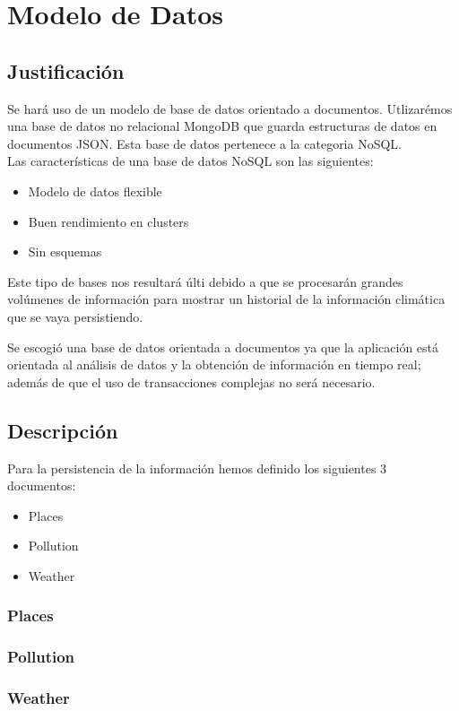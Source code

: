 \clearpage
\chapter{Modelo de Datos}

\section{Justificación}
Se hará uso de un modelo de base de datos orientado a documentos. Utlizarémos una base de datos no relacional MongoDB que guarda estructuras de datos en documentos JSON. Esta base de datos pertenece a la categoria NoSQL. \\
\newline
Las características de una base de datos NoSQL son las siguientes:

\begin{itemize}
  \item Modelo de datos flexible
  \item Buen rendimiento en clusters 
  \item Sin esquemas
\end{itemize}

Este tipo de bases nos resultará últi debido a que se procesarán grandes volúmenes de información para mostrar un historial de la información climática que se vaya persistiendo. 

Se escogió una base de datos orientada a documentos ya que la aplicación está orientada al análisis de datos y la obtención de información en tiempo real; además de que el uso de transacciones complejas no será necesario. 

\section{Descripción}
Para la persistencia de la información hemos definido los siguientes 3 documentos:   
\begin{itemize}
  \item Places
  \item Pollution
  \item Weather  
\end{itemize}

\subsection{Places}


\subsection{Pollution}


\subsection{Weather}
